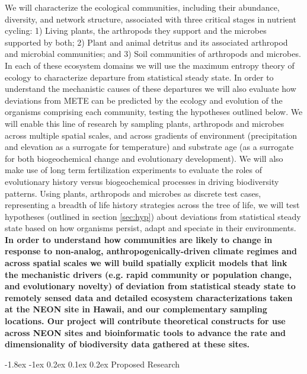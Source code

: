 \documentclass[11pt]{article}
\makeatletter
\renewcommand\section{\@startsection{section}{1}{\z@}%
                                  {-1.8ex \@plus -1ex \@minus 0.2ex}%
                                  {0.1ex \@plus 0.2ex}%
                                  {\normalfont\Large\bfseries}}
\makeatother
\begin{document}
We will characterize the ecological communities, including their
abundance, diversity, and network structure, associated with three
critical stages in nutrient cycling: 1) Living plants, the arthropods
they support and the microbes supported by both; 2) Plant and animal
detritus and its associated arthropod and microbial communities; and
3) Soil communities of arthropods and microbes.  In each of these
ecosystem domains we will use the maximum entropy theory of ecology to
characterize departure from statistical steady state.  In order to
understand the mechanistic causes of these departures we will also
evaluate how deviations from METE can be predicted by the ecology and
evolution of the organisms comprising each community, testing the
hypotheses outlined below.  We will enable this line of research by
sampling plants, arthropods and microbes across multiple spatial
scales, and across gradients of environment (precipitation and
elevation as a surrogate for temperature) and substrate age (as a
surrogate for both biogeochemical change and evolutionary
development).  We will also make use of long term fertilization
experiments \citep[see letter of
collaboration;][]{vitousek1997nutrient} to evaluate the roles of
evolutionary history versus biogeochemical processes in driving
biodiversity patterns.  Using plants, arthropods and microbes as
discrete test cases, representing a breadth of life history strategies
across the tree of life, we will test hypotheses (outlined in section
\ref{sec:hyp}) about deviations from statistical steady state based on
how organisms persist, adapt and speciate in their environments.  
{\bf In order to understand how communities are likely to change in
  response to non-analog, anthropogenically-driven climate regimes and
  across spatial scales we will build spatially explicit models that
  link the mechanistic drivers (e.g. rapid community or population
  change, and evolutionary novelty) of deviation from statistical
  steady state to remotely sensed data and detailed ecosystem
  characterizations taken at the NEON site in Hawaii, and our
  complementary sampling locations. Our project will contribute
  theoretical constructs for use across NEON sites and bioinformatic
  tools to advance the rate and dimensionality of biodiversity data
  gathered at these sites.}

\section{Proposed Research}
\end{document}
